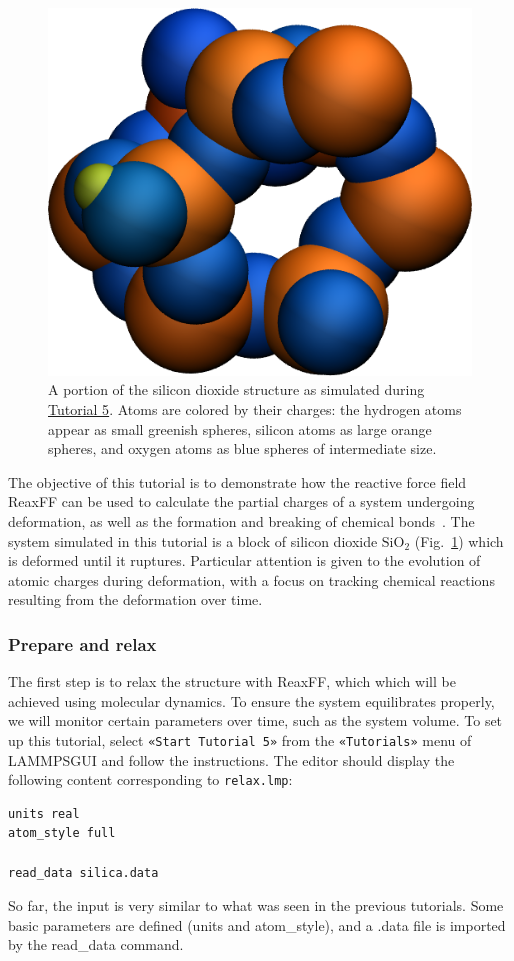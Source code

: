 \documentclass[9pt,tutorial]{livecoms}
\newcommand{\lmpcmd}[1]{\hspace{0pt}\colorbox{listing}{\textcolor{command}{\small{#1}}}\hspace{0pt}} %
\newcommand{\flecmd}[1]{\textcolor{command}{\texttt{#1}}} %
\newcommand{\guicmd}[1]{\textcolor{command}{\texttt{«#1»}}} %
\newcommand{\lammpsgui}{\textsf{LAMMPS\textendash GUI}}
\begin{document}
\begin{figure}
\centering
\includegraphics[width=0.55\linewidth]{SIO}
\caption{A portion of the silicon dioxide structure as simulated during
\hyperref[reactive-silicon-dioxide-label]{Tutorial 5}.  Atoms are colored
by their charges: the hydrogen atoms appear as small greenish spheres, silicon
atoms as large orange spheres, and oxygen atoms as blue spheres of intermediate
size.}
\label{fig:SIO}
\end{figure}

The objective of this tutorial is to demonstrate how the reactive force field ReaxFF
can be used to calculate the partial charges of a system undergoing deformation, as well as
the formation and breaking of chemical bonds~\cite{van2001reaxff, zou2012investigation}.
The system simulated in this tutorial is a block of silicon dioxide $\text{SiO}_2$ (Fig.~\ref{fig:SIO})
which is deformed until it ruptures.  Particular attention is given to the evolution
of atomic charges during deformation, with a focus on tracking chemical reactions
resulting from the deformation over time.

\subsubsection{Prepare and relax}

The first step is to relax the structure with ReaxFF, which which will be achieved using
molecular dynamics.  To ensure the system equilibrates properly, we will monitor certain
parameters over time, such as the system volume.  To set up this
tutorial, select \guicmd{Start Tutorial 5} from the
\guicmd{Tutorials} menu of \lammpsgui{} and follow the instructions.
The editor should display the following content corresponding to \flecmd{relax.lmp}:
\begin{lstlisting}
units real
atom_style full

read_data silica.data

\end{lstlisting}
So far, the input is very similar to what was seen in the previous tutorials.
Some basic parameters are defined (\lmpcmd{units} and \lmpcmd{atom\_style}),
and a \lmpcmd{.data} file is imported by the \lmpcmd{read\_data} command.
\end{document}
